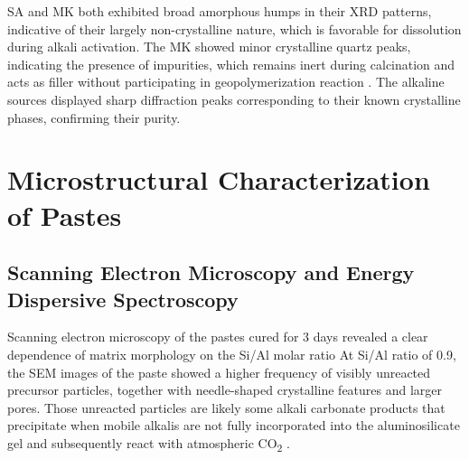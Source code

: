 SA and MK both exhibited broad amorphous humps in their XRD patterns, indicative of their largely non-crystalline nature, which is favorable for dissolution during alkali activation.
The MK showed minor crystalline quartz peaks, indicating the presence of impurities, which remains inert during calcination \cite{provis2014geopolymers} and acts as filler without participating in geopolymerization reaction \cite{rakhimova2019metakaolin}.
The alkaline sources displayed sharp diffraction peaks corresponding to their known crystalline phases, confirming their purity.




\section{Microstructural Characterization of Pastes}

\subsection{Scanning Electron Microscopy and Energy Dispersive Spectroscopy}

Scanning electron microscopy of the pastes cured for 3 days revealed a clear dependence of matrix morphology on the Si/Al molar ratio
At Si/Al ratio of 0.9, the SEM images of the paste showed a higher frequency of visibly unreacted precursor particles, together with needle-shaped crystalline features and larger pores. Those unreacted particles are likely some alkali carbonate products that precipitate when mobile alkalis are not fully incorporated into the aluminosilicate gel and subsequently react with atmospheric CO\textsubscript{2} \cite{provis2018alkali}.

